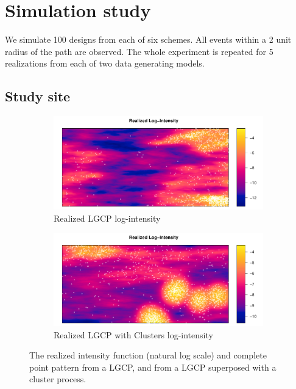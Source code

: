 \documentclass[review]{elsarticle}
\begin{document}
\section{Simulation study}

We simulate 100 designs from each of six schemes. All events within a 2 unit
radius of the path are observed. The whole experiment is repeated for 5
realizations from each of two data generating models.


\subsection{Study site}

\begin{figure}

\begin{subfigure}{5in}
\includegraphics[width=5in]{../graphics/lambda-LGCP000004.pdf}
\caption{Realized LGCP log-intensity}
\label{lambdalgcp}
\end{subfigure}

\begin{subfigure}{5in}
\includegraphics[width=5in]{../graphics/lambda-Cluster000004.pdf}
\caption{Realized LGCP with Clusters log-intensity}
\label{lambdacluster}
\end{subfigure}

\caption{The realized intensity function (natural log scale) and complete
point pattern from a LGCP, and from a LGCP superposed with a cluster process.}
\label{fulldata}
\end{figure}
\end{document}
